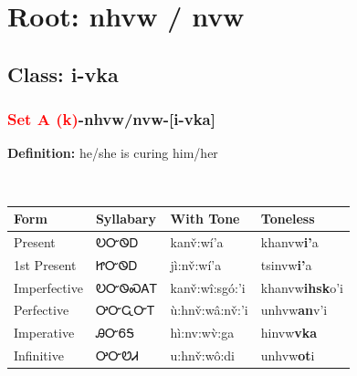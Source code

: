 \needspace{4in}
\section*{Root: nhvw / nvw}
\nopagebreak
{}
\needspace{3in}
\subsection*{Class: i-vka}
\nopagebreak
\needspace{2in}
\subsubsection*{\textcolor{Red}{Set A (k)}{-}\textbf{nhvw/nvw}{-}[i-vka]}
\nopagebreak
\textbf{Definition: } he/she is curing him/her
\\[0.5em]
\begin{tabularx}{\textwidth}{l X X X}%
\toprule%
\textbf{Form}&\textbf{Syllabary}&\textbf{With Tone}&\textbf{Toneless}\\%
\midrule%
Present&ᎧᏅᏫᎠ&kanv̌:wí’a&khanvw\textbf{i'}a\\%
1st Present&ᏥᏅᏫᎠ&jì:nv̌:wí’a&tsinvw\textbf{i'}a\\%
Imperfective&ᎧᏅᏫᏍᎪᎢ&kanv̌:wî:sgó:’i&khanvw\textbf{ihsk}o'i\\%
Perfective&ᎤᏅᏩᏅᎢ&ù:hnv̌:wâ:nv̌:’i&unhvw\textbf{an}v'i\\%
Imperative&ᎯᏅᏮᎦ&hì:nv:wv̀:ga&hinvw\textbf{vka}\\%
Infinitive&ᎤᏅᏬᏗ&u:hnv̌:wô:di&unhvw\textbf{ot}i\\%
\bottomrule%
\end{tabularx}
\\[1em]